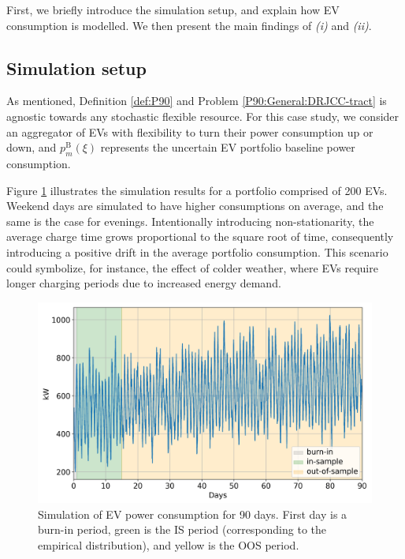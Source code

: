 \documentclass[conference]{IEEEtran}
\begin{document}
First, we briefly introduce the simulation setup, and explain how \ac{EV} consumption is modelled. We then present the main findings of \textit{(i)} and \textit{(ii)}.

\subsection{Simulation setup}\label{sec:sim-setup}

As mentioned, Definition \ref{def:P90} and Problem \eqref{P90:General:DRJCC-tract} is agnostic towards any stochastic flexible resource. For this case study, we consider an aggregator of \acp{EV} with flexibility to turn their power consumption up or down, and $p_{m}^{\text{B}}(\xi)$ represents the uncertain \ac{EV} portfolio baseline power consumption.

Figure \ref{fig:drjcc_raw} illustrates the simulation results for a portfolio comprised of 200 \acp{EV}. Weekend days are simulated to have higher consumptions on average, and the same is the case for evenings. Intentionally introducing non-stationarity, the average charge time grows proportional to the square root of time, consequently introducing a positive drift in the average portfolio consumption. This scenario could symbolize, for instance, the effect of colder weather, where \acp{EV} require longer charging periods due to increased energy demand.

\begin{figure}[t]
    \centering
    \includegraphics[width=\columnwidth]{../figures/drjcc_raw.png}
    \caption{Simulation of \ac{EV} power consumption for 90 days. First day is a burn-in period, green is the \ac{IS} period (corresponding to the empirical distribution), and yellow is the \ac{OOS} period.}
    \label{fig:drjcc_raw}
\end{figure}
\end{document}
